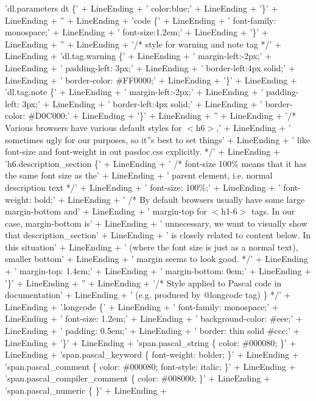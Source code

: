 \documentclass{report}
\begin{document}
\begin{list}{}
\begin{flushleft}
\begin{ttfamily}
'dl.parameters dt {\{}' + LineEnding +
'  color:blue;' + LineEnding +
'{\}}' + LineEnding +
'' + LineEnding +
'code {\{}' + LineEnding +
'  font-family: monospace;' + LineEnding +
'  font-size:1.2em;' + LineEnding +
'{\}}' + LineEnding +
'' + LineEnding +
'/* style for warning and note tag */' + LineEnding +
'dl.tag.warning {\{}' + LineEnding +
'  margin-left:-2px;' + LineEnding +
'  padding-left: 3px;' + LineEnding +
'  border-left:4px solid;' + LineEnding +
'  border-color: {\#}FF0000;' + LineEnding +
'{\}}' + LineEnding +
'dl.tag.note {\{}' + LineEnding +
'  margin-left:-2px;' + LineEnding +
'  padding-left: 3px;' + LineEnding +
'  border-left:4px solid;' + LineEnding +
'  border-color: {\#}D0C000;' + LineEnding +
'{\}}' + LineEnding +
'' + LineEnding +
'/* Various browsers have various default styles for {$<$}h6{$>$},' + LineEnding +
'   sometimes ugly for our purposes, so it''s best to set things' + LineEnding +
'   like font-size and font-weight in out pasdoc.css explicitly. */' + LineEnding +
'h6.description{\_}section {\{}' + LineEnding +
'  /* font-size 100{\%} means that it has the same font size as the' + LineEnding +
'     parent element, i.e. normal description text */' + LineEnding +
'  font-size: 100{\%};' + LineEnding +
'  font-weight: bold;' + LineEnding +
'  /* By default browsers usually have some large margin-bottom and' + LineEnding +
'     margin-top for {$<$}h1-6{$>$} tags. In our case, margin-bottom is' + LineEnding +
'     unnecessary, we want to visually show that description{\_}section' + LineEnding +
'     is closely related to content below. In this situation' + LineEnding +
'     (where the font size is just as a normal text), smaller bottom' + LineEnding +
'     margin seems to look good. */' + LineEnding +
'  margin-top: 1.4em;' + LineEnding +
'  margin-bottom: 0em;' + LineEnding +
'{\}}' + LineEnding +
'' + LineEnding +
'/* Style applied to Pascal code in documentation' + LineEnding +
'   (e.g. produced by @longcode tag) {\}} */' + LineEnding +
'.longcode {\{}' + LineEnding +
'  font-family: monospace;' + LineEnding +
'  font-size: 1.2em;' + LineEnding +
'  background-color: {\#}eee;' + LineEnding +
'  padding: 0.5em;' + LineEnding +
'  border: thin solid {\#}ccc;' + LineEnding +
'{\}}' + LineEnding +
'span.pascal{\_}string {\{} color: {\#}000080; {\}}' + LineEnding +
'span.pascal{\_}keyword {\{} font-weight: bolder; {\}}' + LineEnding +
'span.pascal{\_}comment {\{} color: {\#}000080; font-style: italic; {\}}' + LineEnding +
'span.pascal{\_}compiler{\_}comment {\{} color: {\#}008000; {\}}' + LineEnding +
'span.pascal{\_}numeric {\{} {\}}' + LineEnding +

\end{ttfamily}
\end{flushleft}
\end{list}
\end{document}
